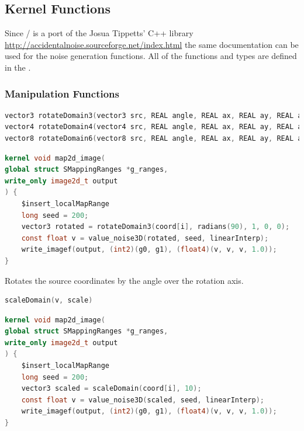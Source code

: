 \subsection{Kernel Functions}

Since \ANLOpenCL/ is a port of the Josua Tippetts' C++ library
\url{http://accidentalnoise.sourceforge.net/index.html} the same documentation
can be used for the noise generation functions.
All of the functions and types are defined in the .

\subsubsection{Manipulation Functions}

\begin{lstlisting}[caption={Definition of rotate domain functions},label={lst:rotate_domain_definition},language=OpenCL]
vector3 rotateDomain3(vector3 src, REAL angle, REAL ax, REAL ay, REAL az);
vector4 rotateDomain4(vector4 src, REAL angle, REAL ax, REAL ay, REAL az);
vector8 rotateDomain6(vector8 src, REAL angle, REAL ax, REAL ay, REAL az);
\end{lstlisting}

\begin{lstlisting}[caption={Example for rotate domain functions},label={lst:rotate_domain_example},language=OpenCL]
kernel void map2d_image(
global struct SMappingRanges *g_ranges,
write_only image2d_t output
) {
    $insert_localMapRange
    long seed = 200;
    vector3 rotated = rotateDomain3(coord[i], radians(90), 1, 0, 0);
    const float v = value_noise3D(rotated, seed, linearInterp);
    write_imagef(output, (int2)(g0, g1), (float4)(v, v, v, 1.0));
}
\end{lstlisting}

Rotates the source coordinates by the angle over the rotation axis.

\begin{lstlisting}[caption={Definition of scale domain function},label={lst:scale_domain_definition},language=OpenCL]
scaleDomain(v, scale)
\end{lstlisting}

\begin{lstlisting}[caption={Example for scale domain function},label={lst:scale_domain_example},language=OpenCL]
kernel void map2d_image(
global struct SMappingRanges *g_ranges,
write_only image2d_t output
) {
    $insert_localMapRange
    long seed = 200;
    vector3 scaled = scaleDomain(coord[i], 10);
    const float v = value_noise3D(scaled, seed, linearInterp);
    write_imagef(output, (int2)(g0, g1), (float4)(v, v, v, 1.0));
}
\end{lstlisting}


